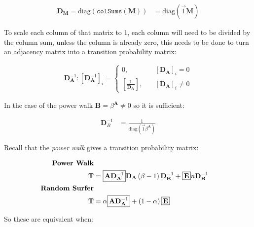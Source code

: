 \documentclass[11pt, twoside]{report}
\begin{document}
\begin{align}
    \mathbf{D}_{\mathbf{M}} = \mathrm{diag}\left( \mathtt{colSums} \left( \mathbf{M} \right) \right) &= \mathrm{diag} \left( \vec{1} \mathbf{M} \right)
\end{align}


To scale each column of that matrix to 1, each column will need to be divided by the column sum, unless the column is already zero, this needs to be done to turn an adjacency matrix into a transition probability matrix:

\begin{align}
    \mathbf{D}_{\mathbf{A}} ^{- 1} :  \left[     \mathbf{D}_{\mathbf{A}} ^{- 1}  \right]_i =
    \begin{cases}
	0 ,& \quad \left[ \mathbf{D}_{\mathbf{A}} \right]_i = 0 \\
	\left[ \frac{1}{\mathbf{D}_{\mathbf{A}}} \right] ,& \enspace \enspace \left[ \mathbf{D}_{\mathbf{A}} \right]_i \neq 0
    \end{cases}
\end{align}

In the case of the power walk \(\mathbf{B}= \beta^{\mathbf{A}} \neq 0\) so it is sufficient:

\begin{align}
	\mathbf{D}_{B}^{- 1} &= \frac{1}{\mathrm{diag}\left( \vec{1}\beta^{\mathbf{A}} \right)} 
\end{align}



Recall that the \emph{power walk} gives a transition probability matrix:

\begin{align}
    \text{\textbf{Power Walk}} \nonumber \\
\mathbf{T} &= \text{\fboxsep=.2em\fbox{$\mathbf{A}\mathbf{D}_{\mathbf{A}}^{- 1}$}}  \mathbf{D}_{\mathbf{A}} \left( \beta - 1 \right) \mathbf{D}_{\mathbf{B}}^{- 1} + \text{\fboxsep=.2em\fbox{$\mathbf{E}$}} n \mathbf{D}_{\mathbf{B}}^{- 1}  \label{eq:pwbx}\\
    \text{\textbf{Random Surfer}} \nonumber \\
    \mathbf{T} &= \alpha \text{\fboxsep=.2em\fbox{$\mathbf{A}\mathbf{D}_{\mathbf{A}}^{- 1}$}}  + \left( 1-\alpha \right) \text{\fboxsep=.2em\fbox{$\mathbf{E}$}}
\end{align}

So these are equivalent when:
\end{document}
